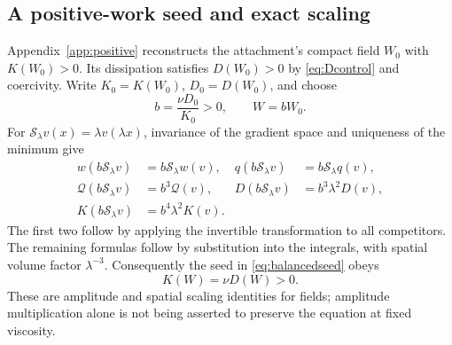 \documentclass[11pt,a4paper]{article}
\theoremstyle{definition}\newtheorem{definition}[theorem]{Definition}
\theoremstyle{remark}\newtheorem{remark}[theorem]{Remark}
\newcommand{\Q}{\mathcal Q}
\numberwithin{equation}{section}
\begin{document}
\subsection{A positive-work seed and exact scaling}
Appendix~\ref{app:positive} reconstructs the attachment's compact field $W_0$ with $K(W_0)>0$. Its dissipation satisfies $D(W_0)>0$ by \eqref{eq:Dcontrol} and coercivity. Write $K_0=K(W_0)$, $D_0=D(W_0)$, and choose
\begin{equation}\label{eq:balancedseed}
 b=\frac{\nu D_0}{K_0}>0,\qquad W=bW_0.
\end{equation}
For $\mathscr S_\lambda v(x)=\lambda v(\lambda x)$, invariance of the gradient space and uniqueness of the minimum give
\begin{align}
 w(b\mathscr S_\lambda v)&=b\mathscr S_\lambda w(v),&
 q(b\mathscr S_\lambda v)&=b\mathscr S_\lambda q(v),\label{eq:scaleobjects}\\
 \Q(b\mathscr S_\lambda v)&=b^3\Q(v),&
 D(b\mathscr S_\lambda v)&=b^3\lambda^2D(v),\label{eq:scaleQD}\\
 K(b\mathscr S_\lambda v)&=b^4\lambda^2K(v).&&\label{eq:scaleK}
\end{align}
The first two follow by applying the invertible transformation to all competitors. The remaining formulas follow by substitution into the integrals, with spatial volume factor $\lambda^{-3}$. Consequently the seed in \eqref{eq:balancedseed} obeys
\begin{equation}\label{eq:seedbalance}
 K(W)=\nu D(W)>0.
\end{equation}
These are amplitude and spatial scaling identities for fields; amplitude multiplication alone is not being asserted to preserve the equation at fixed viscosity.
\end{document}
